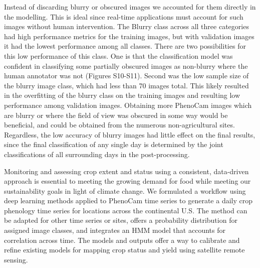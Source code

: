 \documentclass{article}
\begin{document}
Instead of discarding blurry or obscured images we accounted for them directly in the modelling. This is ideal since real-time applications must account for such images without human intervention. The Blurry class across all three categories had high performance metrics for the training images, but with validation images it had the lowest performance among all classes. There are two possibilities for this low performance of this class. One is that the classification model was confident in classifying some partially obscured images as non-blurry where the human annotator was not (Figures S10-S11). Second was the low sample size of the blurry image class, which had less than 70 images total. This likely resulted in the overfitting of the blurry class on the training images and resulting low performance among validation images. Obtaining more PhenoCam images which are blurry or where the field of view was obscured in some way would be beneficial, and could be obtained from the numerous non-agricultural sites. Regardless, the low accuracy of blurry images had little effect on the final results, since the final classification of any single day is determined by the joint classifications of all surrounding days in the post-processing. 

Monitoring and assessing crop extent and status using a consistent, data-driven approach is essential to meeting the growing demand for food while meeting our sustainability goals in light of climate change. We formulated a workflow using deep learning methods applied to PhenoCam time series to generate a daily crop phenology time series for locations across the continental U.S. The method can be adapted for other time series or sites, offers a probability distribution for assigned image classes, and integrates an HMM model that accounts for correlation across time. The models and outputs offer a way to calibrate and refine existing models for mapping crop status and yield using satellite remote sensing.   
\end{document}
